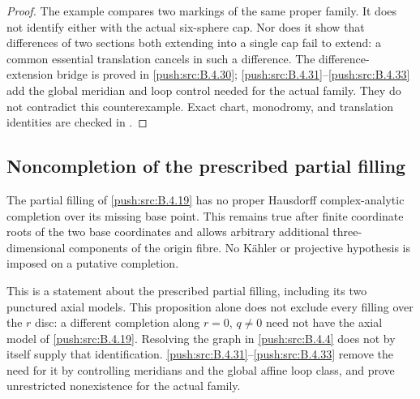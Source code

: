 \begin{proof}
The example compares two markings of the same
proper family. It does not identify either
with the actual six-sphere cap. Nor does it
show that differences of two sections both
extending into a single cap fail to extend:
a common essential translation cancels in
such a difference. The difference-extension bridge
is proved in \ref{push:src:B.4.30}; \ref{push:src:B.4.31}--\ref{push:src:B.4.33} add the global
meridian and loop control needed for the actual family.
They do not contradict this counterexample. Exact chart,
monodromy, and translation identities are
checked in
.
\end{proof}

\subsection{Noncompletion of the prescribed partial filling}

\begin{proposition}\label{push:src:B.4.30}
\label{push:B430}
The partial filling of \ref{push:src:B.4.19} has no proper
Hausdorff complex-analytic completion over its
missing base point. This remains true after finite
coordinate roots of the two base coordinates and
allows arbitrary additional three-dimensional
components of the origin fibre. No K\"ahler or
projective hypothesis is imposed on a putative
completion.

This is a statement about the prescribed partial
filling, including its two punctured axial models.
This proposition alone does not exclude every filling
over the $r$ disc: a different completion along
$r=0$, $q\ne0$ need not have the axial model of
\ref{push:src:B.4.19}. Resolving the graph in \ref{push:src:B.4.4} does not by
itself supply that identification. \ref{push:src:B.4.31}--\ref{push:src:B.4.33}
remove the need for it by controlling meridians and
the global affine loop class, and prove unrestricted
nonexistence for the actual family.
\end{proposition}


